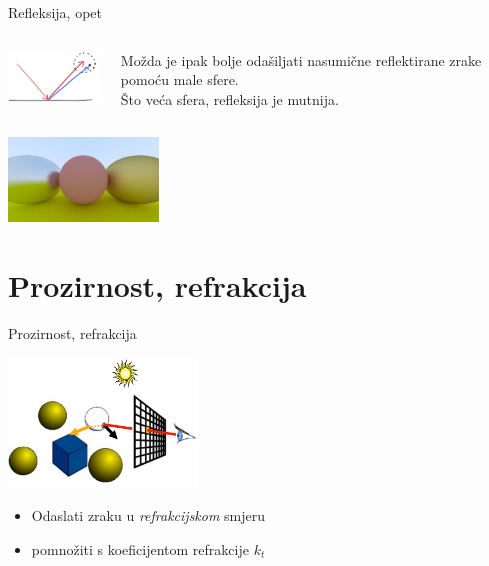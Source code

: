 \documentclass[9pt]{beamer}
\begin{document}
\begin{frame}{Refleksija, opet}
	\begin{columns}
		\begin{column}{0.3\textwidth}
			\begin{center}
				\includegraphics[width=3cm]{slike/fig-1.12-reflect-fuzzy.jpg}
			\end{center}
		\end{column}
		\begin{column}{0.7\textwidth}
			Možda je ipak bolje odašiljati nasumične reflektirane zrake pomoću male sfere. \\
			Što veća sfera, refleksija je mutnija.
		\end{column}
	\end{columns}
	
	\begin{center}
		\includegraphics[width=4cm]{slike/img-1.12-metal-fuzz.png}
	\end{center}
\end{frame}


\section{Prozirnost, refrakcija}
\begin{frame}{Prozirnost, refrakcija}

\begin{center}
\includegraphics[width=5cm]{slike/prozirnost_01.png}
\end{center}
\begin{itemize}
\item Odaslati zraku u \textit{refrakcijskom} smjeru
\item pomnožiti s koeficijentom refrakcije $k_t$
\end{itemize}

\end{frame}
\end{document}
